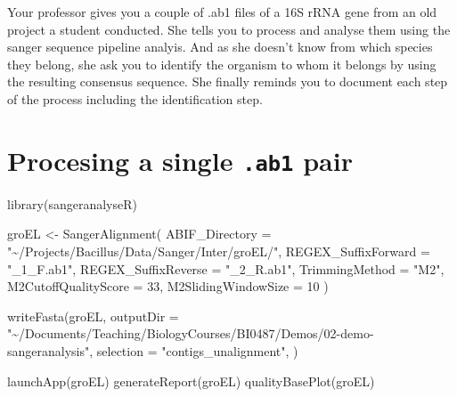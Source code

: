 \documentclass[
  letterpaper,
  DIV=11,
  numbers=noendperiod]{scrreprt}
\newenvironment{Shaded}{\begin{snugshade}}{\end{snugshade}}
\newcommand{\AttributeTok}[1]{\textcolor[rgb]{0.40,0.46,0.14}{#1}}
\newcommand{\DecValTok}[1]{\textcolor[rgb]{0.68,0.00,0.00}{#1}}
\newcommand{\FunctionTok}[1]{\textcolor[rgb]{0.28,0.35,0.67}{#1}}
\newcommand{\NormalTok}[1]{\textcolor[rgb]{0.00,0.46,0.62}{#1}}
\newcommand{\OtherTok}[1]{\textcolor[rgb]{0.00,0.46,0.62}{#1}}
\newcommand{\StringTok}[1]{\textcolor[rgb]{0.13,0.47,0.30}{#1}}
\begin{document}
\begin{tcolorbox}[standard jigsaw,rightrule=.15mm, bottomtitle=1mm, toprule=.15mm, titlerule=0mm, toptitle=1mm, opacitybacktitle=0.6, arc=.35mm, colframe=quarto-callout-warning-color-frame, colbacktitle=quarto-callout-warning-color!10!white, coltitle=black, title=\textcolor{quarto-callout-warning-color}{\faExclamationTriangle}\hspace{0.5em}{Challenge}, bottomrule=.15mm, colback=white, leftrule=.75mm, left=2mm, opacityback=0]
Your professor gives you a couple of .ab1 files of a 16S rRNA gene from
an old project a student conducted. She tells you to process and analyse
them using the sanger sequence pipeline analyis. And as she doesn't know
from which species they belong, she ask you to identify the organism to
whom it belongs by using the resulting consensus sequence. She finally
reminds you to document each step of the process including the
identification step.
\end{tcolorbox}

\hypertarget{procesing-a-single-.ab1-pair}{%
\section*{\texorpdfstring{Procesing a single \texttt{.ab1}
pair}{Procesing a single .ab1 pair}}\label{procesing-a-single-.ab1-pair}}

\begin{Shaded}
\begin{Highlighting}[]
\FunctionTok{library}\NormalTok{(sangeranalyseR)}

\NormalTok{groEL }\OtherTok{\textless{}{-}} \FunctionTok{SangerAlignment}\NormalTok{(}
  \AttributeTok{ABIF\_Directory =} \StringTok{"\textasciitilde{}/Projects/Bacillus/Data/Sanger/Inter/groEL/"}\NormalTok{,}
  \AttributeTok{REGEX\_SuffixForward =} \StringTok{"\_1\_F.ab1"}\NormalTok{,}
  \AttributeTok{REGEX\_SuffixReverse =} \StringTok{"\_2\_R.ab1"}\NormalTok{,}
  \AttributeTok{TrimmingMethod =} \StringTok{"M2"}\NormalTok{,}
  \AttributeTok{M2CutoffQualityScore =} \DecValTok{33}\NormalTok{,}
  \AttributeTok{M2SlidingWindowSize =} \DecValTok{10}
\NormalTok{)}

\FunctionTok{writeFasta}\NormalTok{(groEL, }
           \AttributeTok{outputDir =} \StringTok{"\textasciitilde{}/Documents/Teaching/BiologyCourses/BI0487/Demos/02{-}demo{-}sangeranalysis"}\NormalTok{,}
           \AttributeTok{selection =} \StringTok{"contigs\_unalignment"}\NormalTok{,}
\NormalTok{           )}

\FunctionTok{launchApp}\NormalTok{(groEL)}
\FunctionTok{generateReport}\NormalTok{(groEL)}
\FunctionTok{qualityBasePlot}\NormalTok{(groEL)}
\end{Highlighting}
\end{Shaded}
\end{document}

